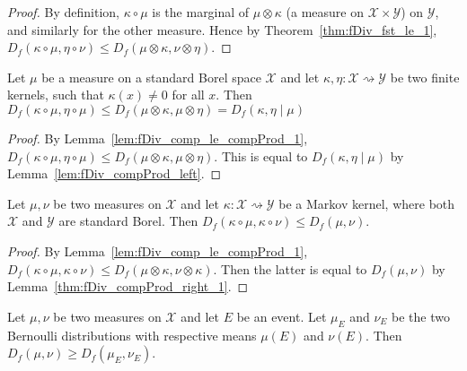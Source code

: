 \begin{proof}\leanok
{}
By definition, $\kappa \circ \mu$ is the marginal of $\mu \otimes \kappa$ (a measure on $\mathcal X \times \mathcal Y$) on $\mathcal Y$, and similarly for the other measure. Hence by Theorem~\ref{thm:fDiv_fst_le_1}, $D_f(\kappa \circ \mu, \eta \circ \nu) \le D_f(\mu \otimes \kappa, \nu \otimes \eta)$. 
\end{proof}

\begin{theorem}
  \label{thm:fDiv_comp_le_condFDiv_1}
  \leanok
  Let $\mu$ be a measure on a standard Borel space $\mathcal X$ and let $\kappa, \eta : \mathcal X \rightsquigarrow \mathcal Y$ be two finite kernels, such that $\kappa(x) \ne 0$ for all $x$.
  Then $D_f(\kappa \circ \mu, \eta \circ \mu) \le D_f(\mu \otimes \kappa, \mu \otimes \eta) = D_f(\kappa, \eta \mid \mu)$
\end{theorem}

\begin{proof}\leanok
{}
By Lemma~\ref{lem:fDiv_comp_le_compProd_1}, $D_f(\kappa \circ \mu, \eta \circ \mu) \le D_f(\mu \otimes \kappa, \mu \otimes \eta)$. This is equal to $D_f(\kappa, \eta \mid \mu)$ by Lemma~\ref{lem:fDiv_compProd_left}.
\end{proof}

\begin{theorem}
  \label{thm:fDiv_data_proc_1}
  \leanok
  Let $\mu, \nu$ be two measures on $\mathcal X$ and let $\kappa : \mathcal X \rightsquigarrow \mathcal Y$ be a Markov kernel, where both $\mathcal X$ and $\mathcal Y$ are standard Borel.
  Then $D_f(\kappa \circ \mu, \kappa \circ \nu) \le D_f(\mu, \nu)$.
\end{theorem}

\begin{proof}\leanok
{}
By Lemma~\ref{lem:fDiv_comp_le_compProd_1}, $D_f(\kappa \circ \mu, \kappa \circ \nu) \le D_f(\mu \otimes \kappa, \nu \otimes \kappa)$. Then the latter is equal to $D_f(\mu, \nu)$ by Lemma~\ref{thm:fDiv_compProd_right_1}.
\end{proof}


\begin{corollary}
  \label{cor:data_proc_event}
  Let $\mu, \nu$ be two measures on $\mathcal X$ and let $E$ be an event. Let $\mu_E$ and $\nu_E$ be the two Bernoulli distributions with respective means $\mu(E)$ and $\nu(E)$. Then $D_f(\mu, \nu) \ge D_f(\mu_E, \nu_E)$.
\end{corollary}

